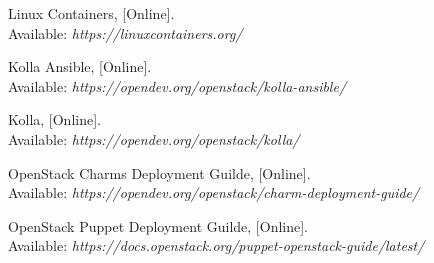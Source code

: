 \documentclass[officiallayout]{tktla}
\begin{document}
\begin{thebibliography}{9}
Linux Containers, [Online]. \\
Available: \textit{https://linuxcontainers.org/}

Kolla Ansible, [Online]. \\
Available: \textit{https://opendev.org/openstack/kolla-ansible/}

Kolla, [Online]. \\
Available: \textit{https://opendev.org/openstack/kolla/}

OpenStack Charms Deployment Guilde, [Online]. \\
Available: \textit{https://opendev.org/openstack/charm-deployment-guide/}

OpenStack Puppet Deployment Guilde, [Online]. \\
Available: \textit{https://docs.openstack.org/puppet-openstack-guide/latest/}

\end{thebibliography}
\end{document}
